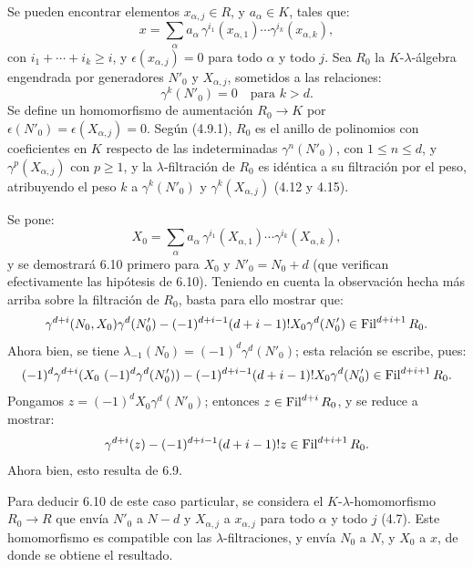 \providecommand{\sisi}[2]{#2}

Se pueden encontrar elementos \(\sisi{z_{\alpha,j}}{x_{\alpha,j}}\in R\), y \(a_\alpha\in K\), tales que: %
\[
  x=\sum_\alpha a_\alpha\,
       \gamma^{i_1}(x_{\alpha,1})\cdots
       \gamma^{i_k}(x_{\alpha,k}),
\]
con \(i_1+\cdots+i_k\ge i\), y \(\epsilon(x_{\alpha,j})=0\) para todo \(\alpha\) y todo \(j\). Sea \(R_0\) la \(K\)-\(\lambda\)-álgebra engendrada por generadores \(N'_0\) y \(X_{\alpha,j}\), sometidos a las relaciones:
\[
  \gamma^k(N'_0)=0\quad\text{para }k>d.
\]
Se define un homomorfismo de aumentación \(R_0\to K\) por \(\epsilon(N'_0)=\epsilon(X_{\alpha,j})=0\). Según (4.9.1), \(R_0\) es el anillo de polinomios con coeficientes en \(K\) respecto de las indeterminadas \(\gamma^n(N'_0)\), con \(1\le n\le d\), y \(\gamma^p(X_{\alpha,j})\) con \(p\ge1\), y la \(\lambda\)-filtración de \(R_0\) es idéntica a su filtración por el peso, atribuyendo el peso \(k\) a \(\gamma^k(N'_0)\) y \(\gamma^k(X_{\alpha,j})\) (4.12 y 4.15).

Se pone:
\[
  X_0=\sum_\alpha a_\alpha\,
       \gamma^{i_1}(X_{\alpha,1})\cdots
       \gamma^{i_k}(X_{\alpha,k}),
\]
y se demostrará 6.10 primero para \(X_0\) y \(N'_0=N_0+d\) (que verifican efectivamente las hipótesis de 6.10). Teniendo en cuenta la observación hecha más arriba sobre la filtración de \(R_0\), basta para ello mostrar que:
\[
  \gamma^{d+i}(N_0,X_0)\gamma^d(N'_0)
  -
  (-1)^{d+i-1}(d+i-1)!X_0\gamma^d(N'_0)
  \in\operatorname{Fil}^{d+i+1}R_0 .
\]
Ahora bien, se tiene \(\lambda_{-1}(N_0)=(-1)^d\gamma^d(N'_0)\); esta relación se escribe, pues:
\[
  (-1)^d\gamma^{d+i}(X_0\ (-1)^d\gamma^d(N'_0))
  -
  (-1)^{d+i-1}(d+i-1)!X_0\gamma^d(N'_0)
  \in\operatorname{Fil}^{d+i+1}R_0 .
\]
Pongamos \(z=(-1)^dX_0\gamma^d(N'_0)\); entonces \(z\in\operatorname{Fil}^{d+i}R_0\), y se reduce a mostrar:
\[
  \gamma^{d+i}(z)-(-1)^{d+i-1}(d+i-1)!z\in\operatorname{Fil}^{d+i+1}R_0 .
\]
Ahora bien, esto resulta de 6.9.

Para deducir 6.10 de este caso particular, se considera el \(K\)-\(\lambda\)-homomorfismo \(R_0\to R\) que envía \(N'_0\) a \(N-d\) y \(X_{\alpha,j}\) a \(x_{\alpha,j}\) para todo \(\alpha\) y todo \(j\) (4.7). Este homomorfismo es compatible con las \(\lambda\)-filtraciones, y envía \(N_0\) a \(N\), y \(X_0\) a \(\sisi{X}{x}\), de donde se obtiene el resultado.

